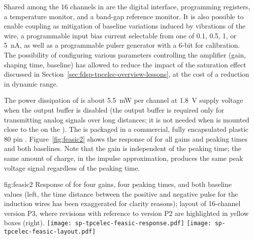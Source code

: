 Shared among the \num{16} channels in  are 
the digital interface, programming registers, a temperature monitor, 
and a band-gap reference monitor. It is also possible to enable  
coupling as mitigation of baseline variations induced by vibrations
of the  wire, a programmable input bias current 
selectable from one of \num{0.1}, \num{0.5}, \num{1}, or \SI{5}{nA}, 
as well as a programmable pulser generator with a \num{6}-bit 
 for calibration. The possibility of configuring various
parameters controlling the  amplifier (gain, shaping time,
baseline) has allowed  to reduce the impact of the
saturation effect discussed in Section~\ref{sec:fdsp-tpcelec-overview-lessons}, 
at the cost of a reduction in dynamic range.

The power dissipation of  is about \SI{5.5}{mW} 
per channel at \SI{1.8}{V} supply voltage when the output buffer is
disabled (the output buffer is required only for transmitting analog
signals over long distances; it is not needed when 
is mounted close to the  on the ).
The  is packaged in a commercial, fully encapsulated 
plastic \num{80} pin . Figure~\ref{fig:feasic2} shows the 
response of  for all gains and peaking times 
and both baselines. Note that the gain is independent of the peaking 
time; the same amount of charge, in the impulse approximation, produces 
the same peak voltage signal regardless of the peaking time.

\begin{dunefigure}
{fig:feasic2}
{Response of  for four gains, four peaking times, 
and both baseline values (left, the time distance between the positive
and negative pulse for the induction wires has been exaggerated
for clarity reasons); layout of \num{16}-channel
 version P3, where revisions with reference to version 
P2 are highlighted in yellow boxes (right).}
\texttt{[image: sp-tpcelec-feasic-response.pdf]}
\hspace{6mm}
\texttt{[image: sp-tpcelec-feasic-layout.pdf]}
\end{dunefigure}

